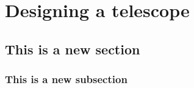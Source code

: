 \chapter{Designing a telescope}
\section{This is a new section}
\subsection{This is a new subsection}
